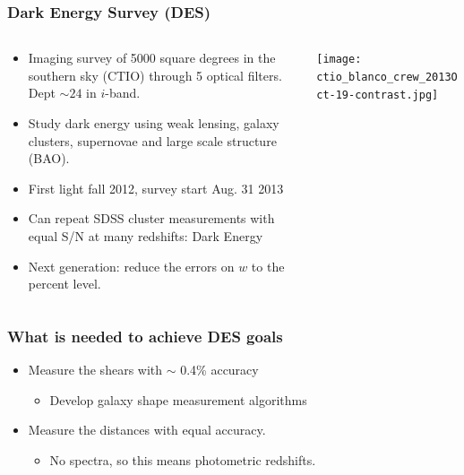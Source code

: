 \documentclass{beamer}
\begin{document}
\frame
{
    \frametitle{Dark Energy Survey (DES)}

    \fontsize{9}{0.8\baselineskip}
    \begin{columns}
        \begin{column}{0.5\textwidth}    
            \begin{itemize}

                \item Imaging survey of 5000 square degrees in the 
                    southern sky (CTIO) through 5 optical filters.  Dept $\sim 24$ in
                    $i$-band.

                \item Study dark energy using weak lensing, galaxy clusters, supernovae
                    and large scale structure (BAO).

                \item First light fall 2012, survey start Aug. 31 2013
                    
                \item Can repeat SDSS cluster measurements with equal S/N at
                    many redshifts: Dark Energy

                \item Next generation:  reduce the errors on $w$ to the percent level.

            \end{itemize}
        \end{column}
        \begin{column}{0.5\textwidth}
            \texttt{[image: ctio\_blanco\_crew\_2013Oct-19-contrast.jpg]}
        \end{column}
    \end{columns}
}


\frame
{
    \frametitle{What is needed to achieve DES goals}

    \begin{itemize}

        \item Measure the shears with $\sim$ 0.4\% accuracy

            \begin{itemize}
                \item Develop galaxy shape measurement algorithms
            \end{itemize}

        \item Measure the distances with equal accuracy.

        \begin{itemize}
            \item No spectra, so this means photometric redshifts.
        \end{itemize}

    \end{itemize}
}
\end{document}
